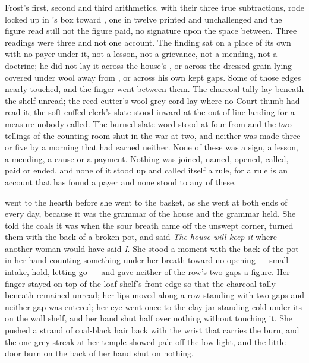 Frost's first, second and third arithmetics, with their three true subtractions, rode locked up  in 's box toward , one in twelve printed and unchallenged and the figure read still not the figure paid, no signature upon the space between. Three readings were three and not one account. The finding sat on a place of its own with no payer under it, not a lesson, not a grievance, not a mending, not a doctrine; he did not lay it across the house's , or across the dressed grain lying covered under wool away from , or across his own kept gaps. Some of those edges nearly touched, and the finger went between them. The charcoal tally lay beneath the shelf unread; the reed-cutter's wool-grey cord lay where no Court thumb had read it; the soft-cuffed clerk's slate stood inward at the out-of-line landing for a measure nobody called. The burned-slate word stood at four from  and the two tellings of the counting room shut in the war at two, and neither was made three or five by a morning that had earned neither. None of these was a sign, a lesson, a mending, a cause or a payment. Nothing was joined, named, opened, called, paid or ended, and none of it stood up and called itself a rule, for a rule is an account that has found a payer and none stood to any of these.

\scenebreak

 went to the hearth before she went to the basket, as she went at both ends of every day, because it was the grammar of the house and the grammar held. She told the coals it was  when the sour breath came off the unswept corner, turned them with the back of a broken pot, and said \emph{The house will keep it} where another woman would have said \emph{I}. She stood a moment with the back of the pot in her hand counting something under her breath toward no opening --- small intake, hold, letting-go --- and gave neither of the row's two gaps a figure. Her finger stayed on top of the loaf shelf's front edge so that the charcoal tally beneath remained unread; her lips moved along a row standing with two gaps and neither gap was entered; her eye went once to the clay jar standing cold under its  on the wall shelf, and her hand shut half over nothing without touching it. She pushed a strand of coal-black hair back with the wrist that carries the burn, and the one grey streak at her temple showed pale off the low light, and the little-door burn on the back of her hand shut on nothing.

